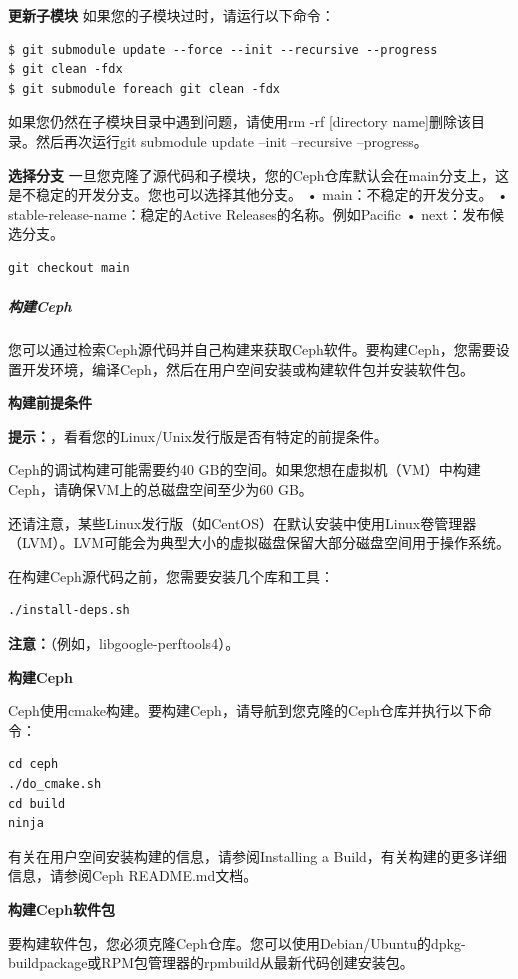 \documentclass[12pt,UTF8]{ctexbook}
\begin{document}
\textbf{更新子模块}
如果您的子模块过时，请运行以下命令：
\begin{verbatim}
$ git submodule update --force --init --recursive --progress
$ git clean -fdx
$ git submodule foreach git clean -fdx
\end{verbatim}

如果您仍然在子模块目录中遇到问题，请使用rm -rf [directory name]删除该目录。然后再次运行git submodule update --init --recursive --progress。

\textbf{选择分支}
一旦您克隆了源代码和子模块，您的Ceph仓库默认会在main分支上，这是不稳定的开发分支。您也可以选择其他分支。
• main：不稳定的开发分支。
• stable-release-name：稳定的Active Releases的名称。例如Pacific
• next：发布候选分支。
\begin{verbatim}
git checkout main
\end{verbatim}

\subparagraph{构建Ceph}
您可以通过检索Ceph源代码并自己构建来获取Ceph软件。要构建Ceph，您需要设置开发环境，编译Ceph，然后在用户空间安装或构建软件包并安装软件包。

\textbf{构建前提条件}

\textbf{提示：}，看看您的Linux/Unix发行版是否有特定的前提条件。

Ceph的调试构建可能需要约40 GB的空间。如果您想在虚拟机（VM）中构建Ceph，请确保VM上的总磁盘空间至少为60 GB。

还请注意，某些Linux发行版（如CentOS）在默认安装中使用Linux卷管理器（LVM）。LVM可能会为典型大小的虚拟磁盘保留大部分磁盘空间用于操作系统。

在构建Ceph源代码之前，您需要安装几个库和工具：
\begin{verbatim}
./install-deps.sh
\end{verbatim}

\textbf{注意：}（例如，libgoogle-perftools4）。

\textbf{构建Ceph}

Ceph使用cmake构建。要构建Ceph，请导航到您克隆的Ceph仓库并执行以下命令：
\begin{verbatim}
cd ceph
./do_cmake.sh
cd build
ninja
\end{verbatim}

有关在用户空间安装构建的信息，请参阅Installing a Build，有关构建的更多详细信息，请参阅Ceph README.md文档。

\textbf{构建Ceph软件包}

要构建软件包，您必须克隆Ceph仓库。您可以使用Debian/Ubuntu的dpkg-buildpackage或RPM包管理器的rpmbuild从最新代码创建安装包。
\end{document}
